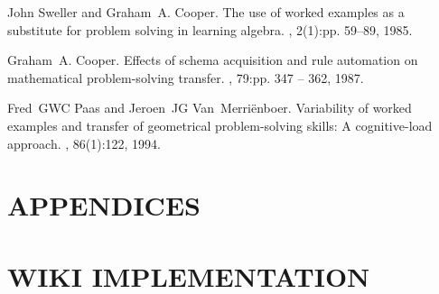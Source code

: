 \documentclass{primus}
\begin{document}
\begin{thebibliography}{1}

John Sweller and Graham~A. Cooper.
\newblock The use of worked examples as a substitute for problem solving in
  learning algebra.
, 2(1):pp. 59--89, 1985.

Graham~A. Cooper.
\newblock Effects of schema acquisition and rule automation on mathematical
  problem-solving transfer.
, 79:pp. 347 -- 362, 1987.

Fred~GWC Paas and Jeroen~JG Van~Merri{\"e}nboer.
\newblock Variability of worked examples and transfer of geometrical
  problem-solving skills: A cognitive-load approach.
, 86(1):122, 1994.

\end{thebibliography}

%
%

\section*{APPENDICES}

\appendix

\section{WIKI IMPLEMENTATION}\label{sec:Appendix}
\end{document}
